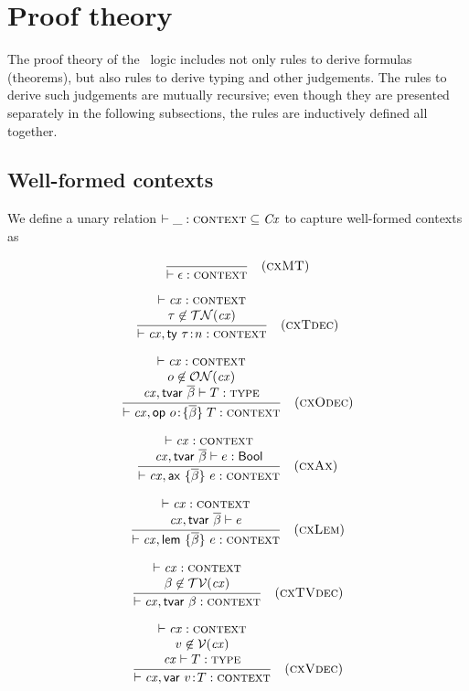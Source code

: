 \section{Proof theory}
\label{proofth}

The proof theory of the \MS\ logic includes not only rules to derive formulas
(theorems), but also rules to derive typing and other judgements. The rules to
derive such judgements are mutually recursive; even though they are presented
separately in the following subsections, the rules are inductively defined all
together.

\subsection{Well-formed contexts}
\label{wfcx-rules}

We define a unary relation $\unarel{\cxwfY}{\Cx}$ to capture well-formed
contexts as

\[
\rruleO
 {\cxwf{\mtcx}}
 {\Rcxmt}
\]

\[
\rruleII
 {\cxwfO}
 {\tnam\not\in\cxtnam{\cx}}
 {\cxwf{\snoc{\cx}{\tdecO}}}
 {\Rcxtdec}
\]

\[
\rruleIII
 {\cxwfO}
 {\onam\not\in\cxonam{\cx}}
 {\isty{\snoc{\cx}{\tvdec{\tvarS}}}{\typ}}
 {\cxwf{\snoc{\cx}{\odecO}}}
 {\Rcxodec}
\]

\[
\rruleII
 {\cxwfO}
 {\hasty{\snoc{\cx}{\tvdec{\tvarS}}}{\expr}{\bool}}
 {\cxwf{\snoc{\cx}{\axO}}}
 {\Rcxax}
\]

\[
\rruleII
 {\cxwfO}
 {\theo{\snoc{\cx}{\tvdec{\tvarS}}}{\expr}}
 {\cxwf{\snoc{\cx}{\lemO}}}
 {\Rcxlem}
\]

\[
\rruleII
 {\cxwfO}
 {\tvar\not\in\cxtvar{\cx}}
 {\cxwf{\snoc{\cx}{\tvdecO}}}
 {\Rcxtvdec}
\]

\[
\rruleIII
 {\cxwfO}
 {\var\not\in\cxvar{\cx}}
 {\isty{\cx}{\typ}}
 {\cxwf{\snoc{\cx}{\vdecO}}}
 {\Rcxvdec}
\]

